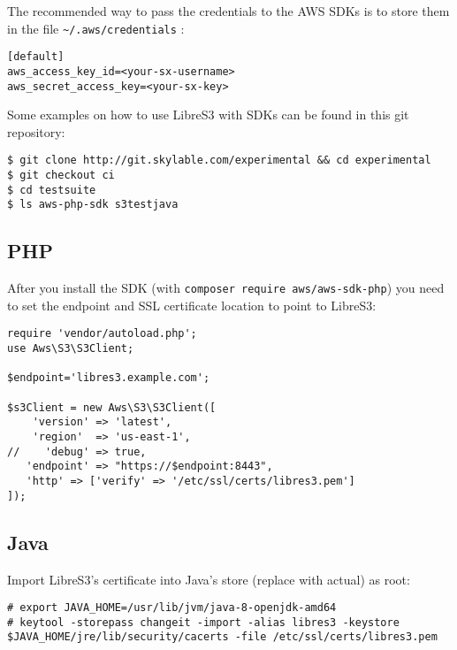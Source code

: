 The recommended way to pass the credentials to the AWS SDKs is to
store them in the file \verb|~/.aws/credentials| :
\begin{lstlisting}
[default]
aws_access_key_id=<your-sx-username>
aws_secret_access_key=<your-sx-key>
\end{lstlisting}

Some examples on how to use LibreS3 with SDKs can be found in this git
repository:
\begin{lstlisting}
$ git clone http://git.skylable.com/experimental && cd experimental
$ git checkout ci
$ cd testsuite
$ ls aws-php-sdk s3testjava
\end{lstlisting}

\subsection{PHP}

After you install the SDK (with \verb|composer require aws/aws-sdk-php|) you
need to set the endpoint and SSL certificate location to point to LibreS3:
\begin{lstlisting}
require 'vendor/autoload.php';
use Aws\S3\S3Client;

$endpoint='libres3.example.com';

$s3Client = new Aws\S3\S3Client([
    'version' => 'latest',
    'region'  => 'us-east-1',
//    'debug' => true,
   'endpoint' => "https://$endpoint:8443",
   'http' => ['verify' => '/etc/ssl/certs/libres3.pem']
]);
\end{lstlisting}

\subsection{Java}

Import LibreS3's certificate into Java's store (replace with actual) as root:
\begin{lstlisting}
# export JAVA_HOME=/usr/lib/jvm/java-8-openjdk-amd64
# keytool -storepass changeit -import -alias libres3 -keystore $JAVA_HOME/jre/lib/security/cacerts -file /etc/ssl/certs/libres3.pem
\end{lstlisting}

